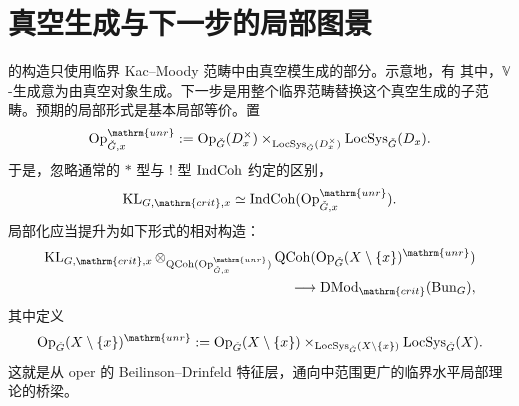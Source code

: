 \section{真空生成与下一步的局部图景}\label{sec:14.6}
的构造只使用临界 Kac–Moody 范畴中由真空模生成的部分。示意地，有
其中，$\mathbb V$-生成意为由真空对象生成。下一步是用整个临界范畴替换这个真空生成的子范畴。预期的局部形式是基本局部等价。置
\[\Op^{\mathrm{unr}}_{\checkG,x}:=\Op_{\checkG}(D_x^\times)\times_{\LocSys_{\checkG}(D_x^\times)}\LocSys_{\checkG}(D_x).\]
于是，忽略通常的 $*$ 型与 $!$ 型 $\operatorname{IndCoh}$ 约定的区别，
\[\operatorname{KL}_{G,\mathrm{crit},x}\simeq\IndCoh(\Op^{\mathrm{unr}}_{\checkG,x}).\]
局部化应当提升为如下形式的相对构造：
\[\begin{split}
\operatorname{KL}_{G,\mathrm{crit},x}\otimes_{\QCoh(\Op^{\mathrm{unr}}_{\checkG,x})}
\QCoh(\Op_{\checkG}(X\setminus\{x\})^{\mathrm{unr}})\\
\longrightarrow\DMod_{\mathrm{crit}}(\Bun_G),
\end{split}\]
其中定义
\[\Op_{\checkG}(X\setminus\{x\})^{\mathrm{unr}}:=\Op_{\checkG}(X\setminus\{x\})\times_{\LocSys_{\checkG}(X\setminus\{x\})}\LocSys_{\checkG}(X).\]
这就是从 oper 的 Beilinson–Drinfeld 特征层，通向\cite{FG05,FG07}中范围更广的临界水平局部理论的桥梁。

